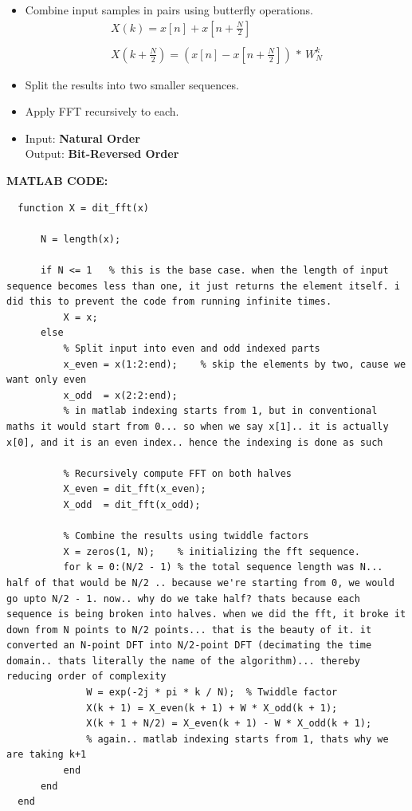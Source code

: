 \documentclass[12pt]{report}
\begin{document}
\begin{enumerate}
      \begin{itemize}
        \item Combine input samples in pairs using butterfly operations. 
          \begin{gather*}
            X(k) = x[n] + x \left[ n + \frac{N}{2} \right] \\ \\
            X \left(k + \frac{N}{2} \right) = \left( x[n] - x \left[ n + \frac{N}{2} \right] \right) \, * \, W_{N}^{k}
          \end{gather*}
        \item Split the results into two smaller sequences.
        \item Apply FFT recursively to each.
        \item Input: \textbf{Natural Order} \\ Output: \textbf{Bit-Reversed Order}
      \end{itemize}
  \end{enumerate}
  \vspace{0.5cm}
  \newpage
  \textbf{MATLAB CODE:}
  \begin{lstlisting}[caption={Custom function for DIT-FFT.}]
    % to compute the DIT algorithm, we have to use a recursive function... there is no better alternative, and if there is, i am unaware of that
  function X = dit_fft(x)

      N = length(x);          
      
      if N <= 1   % this is the base case. when the length of input sequence becomes less than one, it just returns the element itself. i did this to prevent the code from running infinite times.
          X = x;
      else
          % Split input into even and odd indexed parts
          x_even = x(1:2:end);    % skip the elements by two, cause we want only even
          x_odd  = x(2:2:end);
          % in matlab indexing starts from 1, but in conventional maths it would start from 0... so when we say x[1].. it is actually x[0], and it is an even index.. hence the indexing is done as such
          
          % Recursively compute FFT on both halves
          X_even = dit_fft(x_even);
          X_odd  = dit_fft(x_odd);
          
          % Combine the results using twiddle factors
          X = zeros(1, N);    % initializing the fft sequence.
          for k = 0:(N/2 - 1) % the total sequence length was N... half of that would be N/2 .. because we're starting from 0, we would go upto N/2 - 1. now.. why do we take half? thats because each sequence is being broken into halves. when we did the fft, it broke it down from N points to N/2 points... that is the beauty of it. it converted an N-point DFT into N/2-point DFT (decimating the time domain.. thats literally the name of the algorithm)... thereby reducing order of complexity 
              W = exp(-2j * pi * k / N);  % Twiddle factor
              X(k + 1) = X_even(k + 1) + W * X_odd(k + 1);
              X(k + 1 + N/2) = X_even(k + 1) - W * X_odd(k + 1);
              % again.. matlab indexing starts from 1, thats why we are taking k+1 
          end
      end
  end
  \end{lstlisting}
\end{document}

